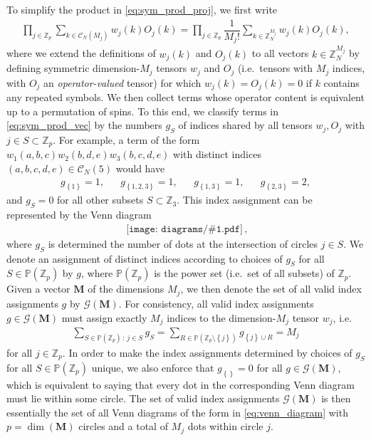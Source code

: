 \documentclass[nofootinbib,notitlepage,11pt]{revtex4-2}
\newcommand{\f}[2]{\dfrac{#1}{#2}} %
\newcommand{\p}[1]{\left(#1\right)} %
\renewcommand{\set}[1]{\left\{#1\right\}} %
\newcommand{\m}{\bm} %
\newcommand{\1}{\mathds{1}}
\newcommand{\C}{\mathcal{C}}
\newcommand{\G}{\mathcal{G}}
\newcommand{\PP}{\mathbb{P}}
\newcommand{\ZZ}{\mathbb{Z}}
\newcommand{\diagram}[1]
{\,\texttt{[image: diagrams/\#1.pdf]}\,}
\begin{document}
To simplify the product in \eqref{eq:sym_prod_proj}, we first write
\begin{align}
  \prod_{j\in\ZZ_p} \sum_{k\in\C_N\p{M_j}} w_j\p{k} O_j\p{k}
  = \prod_{j\in\ZZ_p} \f1{M_j!} \sum_{k\in\ZZ_N^{M_j}}
  w_j\p{k} O_j\p{k},
  \label{eq:sym_prod_vec}
\end{align}
where we extend the definitions of $w_j\p{k}$ and $O_j\p{k}$ to all
vectors $k\in\ZZ_N^{M_j}$ by defining symmetric dimension-$M_j$
tensors $w_j$ and $O_j$ (i.e.~tensors with $M_j$ indices, with $O_j$
an {\it operator-valued} tensor) for which $w_j\p{k}=O_j\p{k}=0$ if
$k$ contains any repeated symbols.  We then collect terms whose
operator content is equivalent up to a permutation of spins.  To this
end, we classify terms in \eqref{eq:sym_prod_vec} by the numbers $g_S$
of indices shared by all tensors $w_j,O_j$ with $j\in S\subset\ZZ_p$.
For example, a term of the form
$w_1\p{a,b,c} w_2\p{b,d,e} w_3\p{b,c,d,e}$ with distinct indices
$\p{a,b,c,d,e}\in\C_N\p{5}$ would have
\begin{align}
  g_{\set{1}} = 1,
  &&
  g_{\set{1,2,3}} = 1,
  &&
  g_{\set{1,3}} = 1,
  &&
  g_{\set{2,3}} = 2,
\end{align}
and $g_S=0$ for all other subsets $S\subset\ZZ_3$.  This index
assignment can be represented by the Venn diagram
\begin{align}
  \diagram{example_123},
  \label{eq:venn_diagram}
\end{align}
where $g_S$ is determined the number of dots at the intersection of
circles $j\in S$.  We denote an assignment of distinct indices
according to choices of $g_S$ for all $S\in\PP\p{\ZZ_p}$ by $g$, where
$\PP\p{\ZZ_p}$ is the power set (i.e.~set of all subsets) of $\ZZ_p$.
Given a vector $\m M$ of the dimensions $M_j$, we then denote the set
of all valid index assignments $g$ by $\G\p{\m M}$.  For consistency,
all valid index assignments $g\in\G\p{\m M}$ must assign exactly $M_j$
indices to the dimension-$M_j$ tensor $w_j$, i.e.~
\begin{align}
  \sum_{S\in\PP\p{\ZZ_p}\,:\,j\in S} g_S
  = \sum_{R\in\PP\p{\ZZ_p\setminus\set{j}}} g_{\set{j}\cup R}
  = M_j
\end{align}
for all $j\in\ZZ_p$.  In order to make the index assignments
determined by choices of $g_S$ for all $S\in\PP\p{\ZZ_p}$ unique, we
also enforce that $g_{\set{}}=0$ for all $g\in\G\p{\m M}$, which is
equivalent to saying that every dot in the corresponding Venn diagram
must lie within some circle.  The set of valid index assignments
$\G\p{\m M}$ is then essentially the set of all Venn diagrams of the
form in \eqref{eq:venn_diagram} with $p=\dim\p{\m M}$ circles and a
total of $M_j$ dots within circle $j$.
\end{document}
